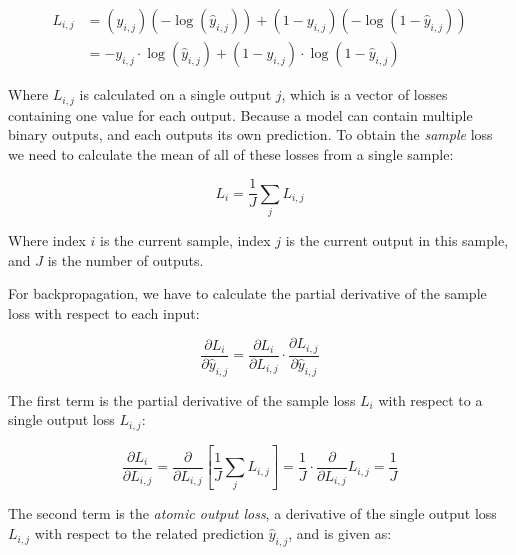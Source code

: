 \documentclass[a4paper]{article}
\begin{document}
\begin{align*}
    L_{i,j} &= (y_{i,j})(-\log(\hat{y}_{i,j})) + (1-y_{i,j})(-\log(1-\hat{y}_{i,j})) \\
    &= -y_{i,j} \cdot \log(\hat{y}_{i,j}) + (1-y_{i,j}) \cdot \log(1-\hat{y}_{i,j})
\end{align*}

Where $L_{i,j}$ is calculated on a single output $j$, which is a vector of losses containing one value for each output. Because a model can contain multiple binary outputs, and each outputs its own prediction. To obtain the \emph{sample} loss we need to calculate the mean of all of these losses from a single sample:

\begin{equation*}
    L_i = \frac{1}{J}\sum_{j}L_{i,j}
\end{equation*}

Where index $i$ is the current sample, index $j$ is the current output in this sample, and $J$ is the number of outputs.

For backpropagation, we have to calculate the partial derivative of the sample loss with respect to
each input:

\begin{equation*}
    \frac{\partial L_i}{\partial\hat{y}_{i,j}} = \frac{\partial L_i}{\partial L_{i,j}} \cdot \frac{\partial L_{i,j}}{\partial\hat{y}_{i,j}}
\end{equation*}

The first term is the partial derivative of the sample loss $L_i$ with respect to a single output loss $L_{i,j}$:

\begin{equation*}
    \frac{\partial L_i}{\partial L_{i,j}} = \frac{\partial}{\partial L_{i,j}} [ \frac{1}{J}\sum_j L_{i,j} ] = \frac{1}{J} \cdot \frac{\partial}{\partial L_{i,j}} L_{i,j} = \frac{1}{J}
\end{equation*}

The second term is the \emph{atomic output loss}, a derivative of the single output loss $L_{i,j}$ with respect to the related prediction $\hat{y}_{i,j}$, and is given as:
\end{document}
